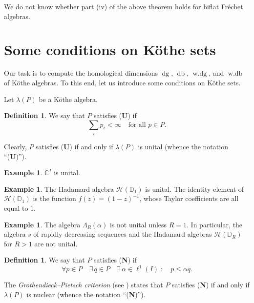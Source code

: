 \documentclass[12pt,reqno]{amsart}
\theoremstyle{definition}
\newtheorem{definition}[theorem]{Definition}
\newtheorem{example}[theorem]{Example}
\begin{document}
We do not know whether part (iv) of the above theorem holds for
biflat Fr\'echet algebras.

\section{Some conditions on K\"othe sets}
Our task is to compute the homological dimensions ${\mathop{\mathrm{dg}}}$, ${\mathop{\mathrm{db}}}$, ${\mathop{\mathrm{w.dg}}}$,
and ${\mathop{\mathrm{w.db}}}$ of K\"othe algebras. To this end, let us introduce some conditions
on K\"othe sets.

Let $\lambda(P)$ be a K\"othe algebra.

\begin{definition}
We say that $P$ satisfies ({\textbf{U}}) if
\begin{equation*}
\sum_i p_i<\infty\quad\text{for all $p\in P$}.
\end{equation*}
\end{definition}

Clearly, $P$ satisfies ({\textbf{U}}) if and only if $\lambda(P)$ is unital
(whence the notation ``({\textbf{U}})'').

\begin{example}
${\mathbb C}^I$ is unital.
\end{example}

\begin{example}
The Hadamard algebra ${\mathscr H}({\mathbb D}_1)$ is unital. The identity element of ${\mathscr H}({\mathbb D}_1)$
is the function $f(z)=(1-z)^{-1}$, whose Taylor coefficients are all equal to $1$.
\end{example}

\begin{example}
\label{example:Lambda_notuni}
The algebra $\Lambda_R(\alpha)$ is not unital unless $R=1$. In particular,
the algebra $s$ of rapidly decreasing sequences and the Hadamard algebras
${\mathscr H}({\mathbb D}_R)$ for $R>1$ are not unital.
\end{example}

\begin{definition}
\label{def:N}
We say that $P$ satisfies ({\textbf{N}}) if
\begin{equation*}
\forall p\in P\quad \exists\, q\in P\quad\exists\,\alpha\in\ell^1(I)\; :\quad
p\le\alpha q.
\end{equation*}
\end{definition}

The {\em Grothendieck--Pietsch criterion} (see \cite[6.1.2]{Pietsch}) states that
$P$ satisfies ({\textbf{N}}) if and only if $\lambda(P)$ is nuclear
(whence the notation ``({\textbf{N}})'').
\end{document}
